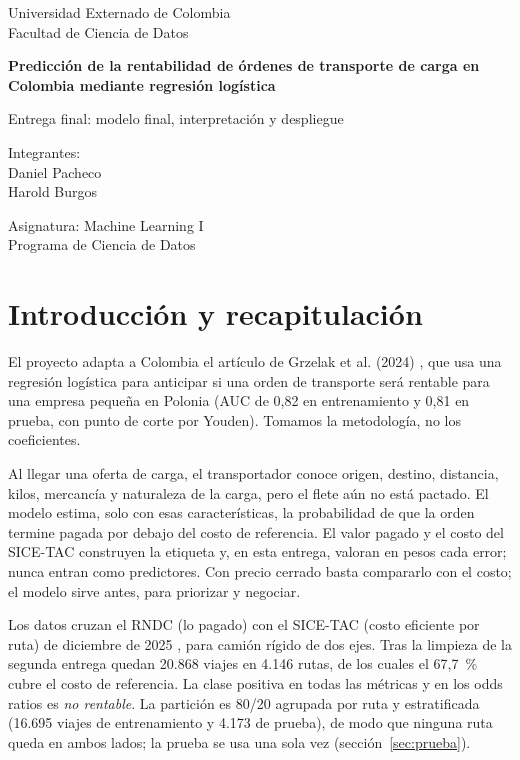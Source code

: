\documentclass[11pt,letterpaper]{article}
\begin{document}
\begin{titlepage}
\centering
{\large Universidad Externado de Colombia\\Facultad de Ciencia de Datos\par}
\vspace{3cm}
{\LARGE\bfseries Predicción de la rentabilidad de órdenes de transporte de carga en Colombia mediante regresión logística\par}
\vspace{1cm}
{\large Entrega final: modelo final, interpretación y despliegue\par}
\vspace{3cm}
{\large Integrantes:\\Daniel Pacheco\\Harold Burgos\par}
\vfill
{\large Asignatura: Machine Learning I\\Programa de Ciencia de Datos\par}
\end{titlepage}

\section{Introducción y recapitulación}

El proyecto adapta a Colombia el artículo de Grzelak et al. (2024) \cite{grzelak}, que usa una regresión logística para anticipar si una orden de transporte será rentable para una empresa pequeña en Polonia (AUC de 0,82 en entrenamiento y 0,81 en prueba, con punto de corte por Youden). Tomamos la metodología, no los coeficientes.

Al llegar una oferta de carga, el transportador conoce origen, destino, distancia, kilos, mercancía y naturaleza de la carga, pero el flete aún no está pactado. El modelo estima, solo con esas características, la probabilidad de que la orden termine pagada por debajo del costo de referencia. El valor pagado y el costo del SICE-TAC construyen la etiqueta y, en esta entrega, valoran en pesos cada error; nunca entran como predictores. Con precio cerrado basta compararlo con el costo; el modelo sirve antes, para priorizar y negociar.

Los datos cruzan el RNDC (lo pagado) con el SICE-TAC (costo eficiente por ruta) de diciembre de 2025 \cite{rndc,sicetac}, para camión rígido de dos ejes. Tras la limpieza de la segunda entrega quedan 20.868 viajes en 4.146 rutas, de los cuales el 67,7~\% cubre el costo de referencia. La clase positiva en todas las métricas y en los odds ratios es \emph{no rentable}. La partición es 80/20 agrupada por ruta y estratificada (16.695 viajes de entrenamiento y 4.173 de prueba), de modo que ninguna ruta queda en ambos lados; la prueba se usa una sola vez (sección~\ref{sec:prueba}).
\end{document}
